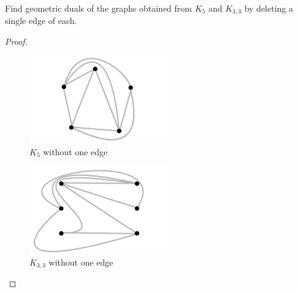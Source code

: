 \prob
{
    Find geometric duals of the graphs obtained from $K_5$ and $K_{3,3}$ by
    deleting a single edge of each.
}
\begin{proof}$\,$\pn
    \begin{figure}[H]
        \begin{center}
        \includegraphics[width=6cm]{Test2/Problem9/PlanarK5WithoutOneEdge.png}
        \end{center}                            
        \caption{$K_5$ without one edge}
        \label{t2:p9_PlanarK5WithoutOneEdge.png}                        
    \end{figure}\pn    
    
    \begin{figure}[H]
        \begin{center}
        \includegraphics[width=6cm]{Test2/Problem9/PlanarK3_3WithoutOneEdge.png}
        \end{center}                            
        \caption{$K_{3,3}$ without one edge}
        \label{t2:p9_PlanarK3_3WithoutOneEdge.png}                        
    \end{figure}\pn
\end{proof}